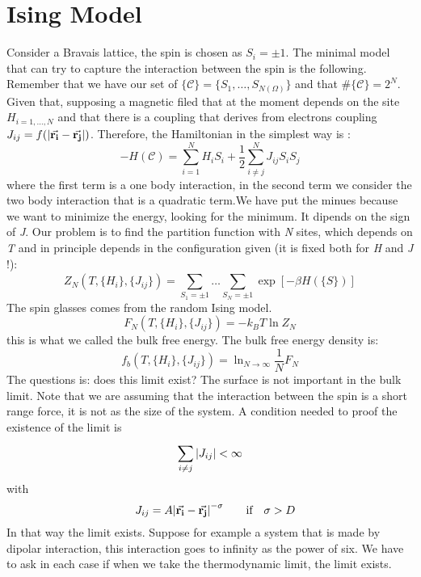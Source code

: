 \documentclass[../main/main.tex]{subfiles}
\begin{document}

\section{Ising Model}
Consider a Bravais lattice, the spin is chosen as \( S_i = \pm 1 \). The minimal model that can try to capture the interaction between the spin is the following. Remember that we have our set of \( \{ \mathcal{C} \} = \{ S_1,\dots,S_{N(\Omega )} \} \)  and that \( \# \{ \mathcal{C} \} = 2^N \). Given that, supposing a magnetic filed that at the moment depends on the site \( H_{i=1,\dots,N} \) and that there is a coupling that derives from electrons coupling \( J_{ij} = f ( \abs{\va{r_i}- \va{r_j}  } ) \).
Therefore, the Hamiltonian in the simplest way is :
\begin{equation}
  -H (\mathcal{C}) = \sum_{i=1}^{N} H_i S_i  + \frac{1}{2} \sum_{i\neq j}^{N}  J_{ij} S_i S_j
\end{equation}
where the first term is a one body interaction, in the second term we consider the two body interaction that is a quadratic term.We have put the minues because we want to minimize the energy, looking for the minimum. It dipends on the sign of  \emph{J}.  Our problem is to find the partition function with \emph{N} sites, which depends on \emph{T} and in principle depends in the configuration given (it is fixed both for \emph{H} and \emph{J}  !):
\begin{equation}
   Z_N (T, \{ H_i \}, \{ J_{ij} \} ) = \sum_{S_1 = \pm 1}^{} \dots \sum_{S_N=\pm 1}^{}  \exp [-\beta H(\{S\})]
\end{equation}
The spin glasses comes from the random Ising model.
\begin{equation}
  F_N (T, \{ H_i \}, \{ J_{ij} \} ) = - k_B T \ln{Z_N}
\end{equation}
this is what we called the bulk free energy. The bulk free energy density is:
\begin{equation}
  f_b (T, \{ H_i \}, \{ J_{ij} \} ) = \ln_{N \rightarrow \infty } {\frac{1}{N} F_N }
\end{equation}
The questions is: does this limit exist? The surface is not important in the bulk limit. Note that we are assuming that the interaction between the spin is a short range force, it is not as the size of the system.
A condition needed to proof the existence of the limit is
\begin{equation}
  \sum_{i \neq j}^{}  \abs{J_{ij}} < \infty
\end{equation}
with
\begin{equation}
  \quad J_{ij} = A \abs{\va{r_i}-\va{r_j}  }^{-\sigma}  \qquad \text{if} \quad \sigma > D
\end{equation}
In that way the limit exists. Suppose for example a system that is made by dipolar interaction, this interaction goes to infinity as the power of six. We have to ask in each case if when we take the thermodynamic limit, the limit exists.
\end{document}
